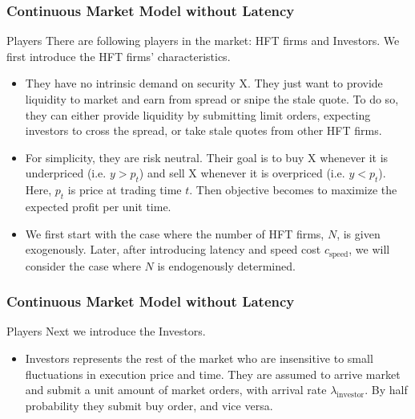 \documentclass{beamer}
\begin{document}
\begin{frame}
    \frametitle{Continuous Market Model without Latency} 
    \begin{block}{Players}
        There are following players in the market: HFT firms and Investors. We first introduce the HFT firms' characteristics.
        \begin{itemize}
            \item They have no intrinsic demand on security X. They just want to provide liquidity to market and earn from spread or snipe the stale quote. To do so, they can either provide liquidity by submitting limit orders, expecting investors to cross the spread, or take stale quotes from other HFT firms.
            \item For simplicity, they are risk neutral. Their goal is to buy X whenever it is underpriced (i.e. $y > p_t$) and sell X whenever it is overpriced (i.e. $y < p_t$). Here, $p_t$ is price at trading time $t$. Then objective becomes to maximize the expected profit per unit time.
            \item We first start with the case where the number of HFT firms, $N$, is given exogenously. Later, after introducing latency and speed cost $c_\text{speed}$, we will consider the case where $N$ is endogenously determined.
        \end{itemize} 
    \end{block}
\end{frame}

\begin{frame}
    \frametitle{Continuous Market Model without Latency} 
    \begin{block}{Players}
        Next we introduce the Investors.
        \begin{itemize}
            \item Investors represents the rest of the market who are insensitive to small fluctuations in execution price and time. They are assumed to arrive market and submit a unit amount of market orders, with arrival rate $\lambda_\text{investor}$. By half probability they submit buy order, and vice versa.
        \end{itemize} 
    \end{block}
\end{frame}
\end{document}
